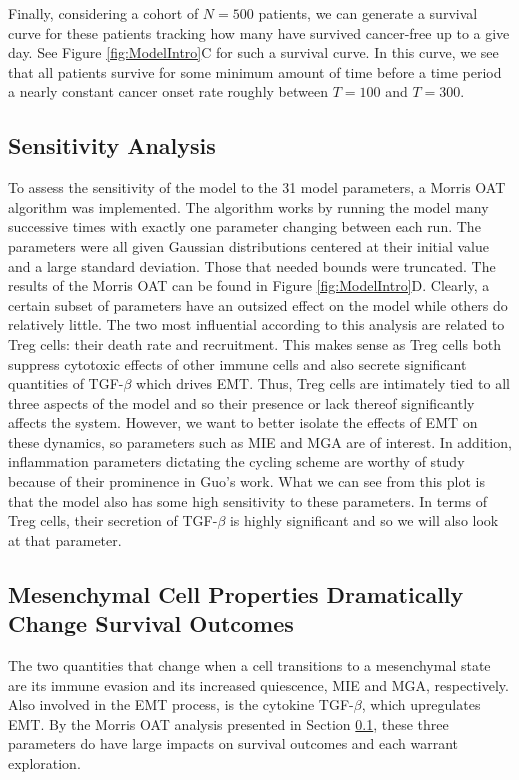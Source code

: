 \documentclass{article}
\begin{document}
Finally, considering a cohort of $N=500$ patients, we can generate a survival curve for these patients tracking how many have survived cancer-free up to a give day.
See Figure \ref{fig:ModelIntro}C for such a survival curve.
In this curve, we see that all patients survive for some minimum amount of time before a time period a nearly constant cancer onset rate roughly between $T = 100$ and $T = 300$.

\subsection{Sensitivity Analysis}\label{SensAnalysis}
To assess the sensitivity of the model to the 31 model parameters, a Morris OAT algorithm was implemented.
The algorithm works by running the model many successive times with exactly one parameter changing between each run\cite{morris1991factorial}\cite{sohier2014improvement}.
The parameters were all given Gaussian distributions centered at their initial value and a large standard deviation.
Those that needed bounds were truncated.
The results of the Morris OAT can be found in Figure \ref{fig:ModelIntro}D.
Clearly, a certain subset of parameters have an outsized effect on the model while others do relatively little.
The two most influential according to this analysis are related to Treg cells: their death rate and recruitment.
This makes sense as Treg cells both suppress cytotoxic effects of other immune cells and also secrete significant quantities of TGF-$\beta$ which drives EMT.
Thus, Treg cells are intimately tied to all three aspects of the model and so their presence or lack thereof significantly affects the system.
However, we want to better isolate the effects of EMT on these dynamics, so parameters such as MIE and MGA are of interest.
In addition, inflammation parameters dictating the cycling scheme are worthy of study because of their prominence in Guo's work.
What we can see from this plot is that the model also has some high sensitivity to these parameters.
In terms of Treg cells, their secretion of TGF-$\beta$ is highly significant and so we will also look at that parameter.

\subsection{Mesenchymal Cell Properties Dramatically Change Survival Outcomes}\label{MesPars}
The two quantities that change when a cell transitions to a mesenchymal state are its immune evasion and its increased quiescence, MIE and MGA, respectively.
Also involved in the EMT process, is the cytokine TGF-$\beta$, which upregulates EMT.
By the Morris OAT analysis presented in Section \ref{SensAnalysis}, these three parameters do have large impacts on survival outcomes and each warrant exploration.
\end{document}
